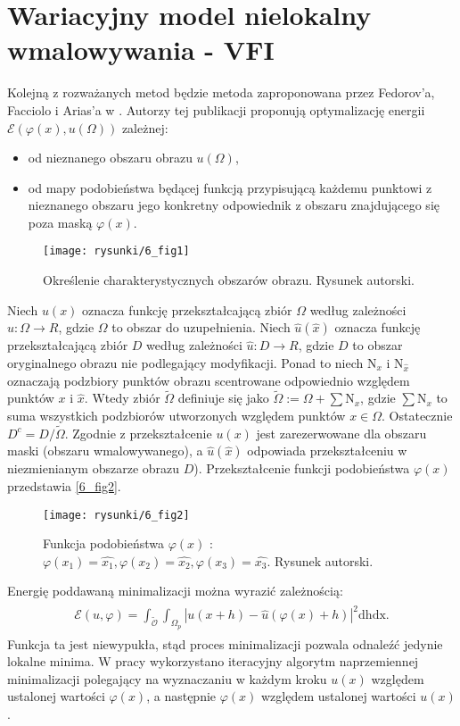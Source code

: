 \documentclass[a4paper,12pt,twoside,openany]{report}
\newcommand*{\abs}[1]{\left\vert{#1}\right\vert}
\begin{document}
\section{Wariacyjny model nielokalny wmalowywania - VFI}
\label{sec:sVFI}
Kolejną z rozważanych metod będzie metoda zaproponowana przez Fedorov'a, Facciolo i Arias'a w \cite{arias2011variational}. Autorzy tej publikacji proponują optymalizację energii $\mathcal{E}(\varphi(x), u(\Omega))$ zależnej:
\begin{itemize}
\item
od nieznanego obszaru obrazu $u(\Omega)$,
\item
od mapy podobieństwa będącej funkcją przypisującą każdemu punktowi z nieznanego obszaru jego konkretny odpowiednik z obszaru znajdującego się poza maską $\varphi(x)$.
\end{itemize}
\begin{figure}[!h]
	\centering
	\texttt{[image: rysunki/6\_fig1]}
	\caption{Określenie charakterystycznych obszarów obrazu. Rysunek autorski.}
	\label{6_fig1}
\end{figure}
Niech $u(x)$ oznacza funkcję przekształcającą zbiór $\Omega$ według zależności  $u:\Omega \rightarrow R$, gdzie $\Omega$ to obszar do uzupełnienia.
Niech $\hat{u}(\hat{x})$ oznacza funkcję przekształcającą zbiór $D$ według zależności $\hat{u} : D \rightarrow R$, gdzie $D$ to obszar oryginalnego obrazu nie podlegający modyfikacji.
Ponad to niech $\mathrm{N}_x$ i $\mathrm{N}_{\hat{x}}$ oznaczają podzbiory punktów obrazu scentrowane odpowiednio względem punktów $x$ i $\hat{x}$.
Wtedy zbiór $\widetilde{\Omega}$ definiuje się jako $\widetilde{\Omega} := \Omega + \sum {\mathrm{N}}_x$, gdzie $\sum {\mathrm{N}}_x$ to suma wszystkich podzbiorów utworzonych względem punktów $x \in \Omega$. Ostatecznie $D^c = D / \widetilde{\Omega}$.
Zgodnie z \cite{arias2011variational} przekształcenie $u(x)$ jest zarezerwowane dla obszaru maski (obszaru wmalowywanego), a $\hat{u}(\hat{x})$ odpowiada przekształceniu w niezmienianym obszarze obrazu $D$). 
Przekształcenie funkcji podobieństwa $\varphi(x)$ przedstawia \autoref{6_fig2}.
\begin{figure}[!h]
	\centering
	\texttt{[image: rysunki/6\_fig2]}
	\caption{Funkcja podobieństwa $\varphi(x)$ : $\varphi(x_1)=\hat{x_1}, \varphi(x_2)=\hat{x_2}, \varphi(x_3)=\hat{x_3}$. Rysunek autorski.}
	\label{6_fig2}
\end{figure}
Energię poddawaną minimalizacji można wyrazić zależnością:
\begin{align}
\begin{aligned}
\mathcal{E}(u,\varphi) = \int_{\mathcal{\widetilde{O}}}\int_{\Omega_p}\abs{u(x+h) - \hat{u}(\varphi(x)+h)}^2\mathrm{dhdx}.
\end{aligned}
\end{align}
Funkcja ta jest niewypukła, stąd proces minimalizacji pozwala odnaleźć jedynie lokalne minima. W pracy wykorzystano iteracyjny algorytm naprzemiennej minimalizacji polegający na wyznaczaniu w każdym kroku $u(x)$ względem ustalonej wartości $\varphi(x)$, a następnie $\varphi(x)$ względem ustalonej wartości $u(x)$.
\end{document}
